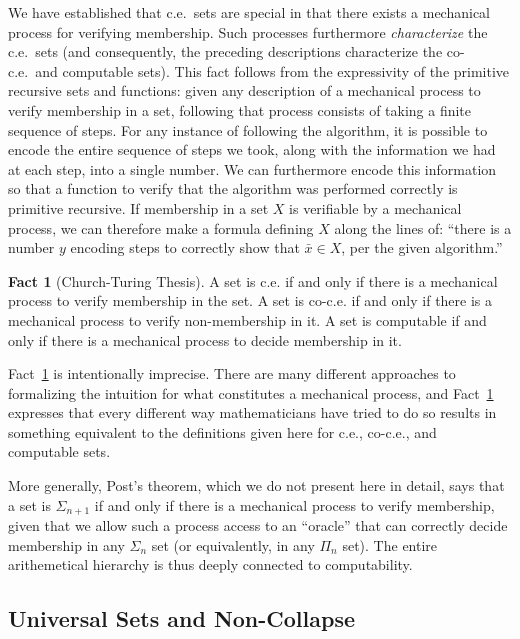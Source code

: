 \documentclass{article}
\theoremstyle{plain}
\theoremstyle{definition}
\newtheorem{fact}[thm]{Fact}
\newcommand{\tuple}{\bar}
\begin{document}
We have established that c.e.\ sets are special in that there exists a
mechanical process for verifying membership. Such processes
furthermore \emph{characterize} the c.e.\ sets (and consequently, the
preceding descriptions characterize the co-c.e.\ and computable
sets). This fact follows from the expressivity of the primitive
recursive sets and functions: given any description of a mechanical
process to verify membership in a set, following that process consists
of taking a finite sequence of steps. For any instance of following
the algorithm, it is possible to encode the entire sequence of steps
we took, along with the information we had at each step, into a single
number. We can furthermore encode this information so that a function
to verify that the algorithm was performed correctly is primitive
recursive. If membership in a set $X$ is verifiable by a mechanical
process, we can therefore make a formula defining $X$ along the lines
of: ``there is a number $y$ encoding steps to correctly show that
$\tuple{x} \in X$, per the given algorithm.''

\begin{fact}[Church-Turing Thesis]\label{fact:ct-thesis}
  A set is c.e. if and only if there is a mechanical process to verify
  membership in the set. A set is co-c.e. if and only if there is a
  mechanical process to verify non-membership in it. A set is
  computable if and only if there is a mechanical process to decide
  membership in it.
\end{fact}

Fact~\ref{fact:ct-thesis} is intentionally imprecise. There are many
different approaches to formalizing the intuition for what constitutes
a mechanical process, and Fact~\ref{fact:ct-thesis} expresses that
every different way mathematicians have tried to do so results in
something equivalent to the definitions given here for c.e., co-c.e.,
and computable sets.

More generally, Post's theorem, which we do not present here in
detail, says that a set is $\Sigma_{n+1}$ if and only if there is a
mechanical process to verify membership, given that we allow such a
process access to an ``oracle'' that can correctly decide membership
in any $\Sigma_n$ set (or equivalently, in any $\Pi_n$ set). The
entire arithemetical hierarchy is thus deeply connected to
computability.

\subsection{Universal Sets and Non-Collapse}
\end{document}
